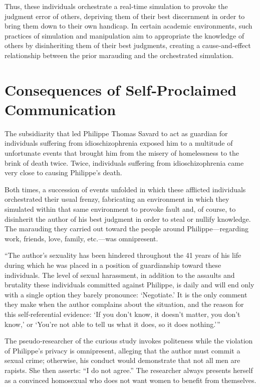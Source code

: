\documentclass[12pt,oneside]{article}
\begin{document}
Thus, these individuals orchestrate a real‑time simulation to provoke the judgment error of others, depriving them of their best discernment in order to bring them down to their own handicap. In certain academic environments, such practices of simulation and manipulation aim to appropriate the knowledge of others by disinheriting them of their best judgments, creating a cause‑and‑effect relationship between the prior marauding and the orchestrated simulation.

\section{Consequences of Self‑Proclaimed Communication}

The subsidiarity that led Philippe Thomas Savard to act as guardian for individuals suffering from idioschizophrenia exposed him to a multitude of unfortunate events that brought him from the misery of homelessness to the brink of death twice. Twice, individuals suffering from idioschizophrenia came very close to causing Philippe’s death.

Both times, a succession of events unfolded in which these afflicted individuals orchestrated their usual frenzy, fabricating an environment in which they simulated within that same environment to provoke fault and, of course, to disinherit the author of his best judgment in order to steal or nullify knowledge. The marauding they carried out toward the people around Philippe—regarding work, friends, love, family, etc.—was omnipresent.

“The author’s sexuality has been hindered throughout the 41 years of his life during which he was placed in a position of guardianship toward these individuals. The level of sexual harassment, in addition to the assaults and brutality these individuals committed against Philippe, is daily and will end only with a single option they barely pronounce: ‘Negotiate.’ It is the only comment they make when the author complains about the situation, and the reason for this self‑referential evidence: ‘If you don’t know, it doesn’t matter, you don’t know,’ or ‘You’re not able to tell us what it does, so it does nothing.’”

The pseudo‑researcher of the curious study invokes politeness while the violation of Philippe’s privacy is omnipresent, alleging that the author must commit a sexual crime; otherwise, his conduct would demonstrate that not all men are rapists. She then asserts: “I do not agree.” The researcher always presents herself as a convinced homosexual who does not want women to benefit from themselves.
\end{document}
